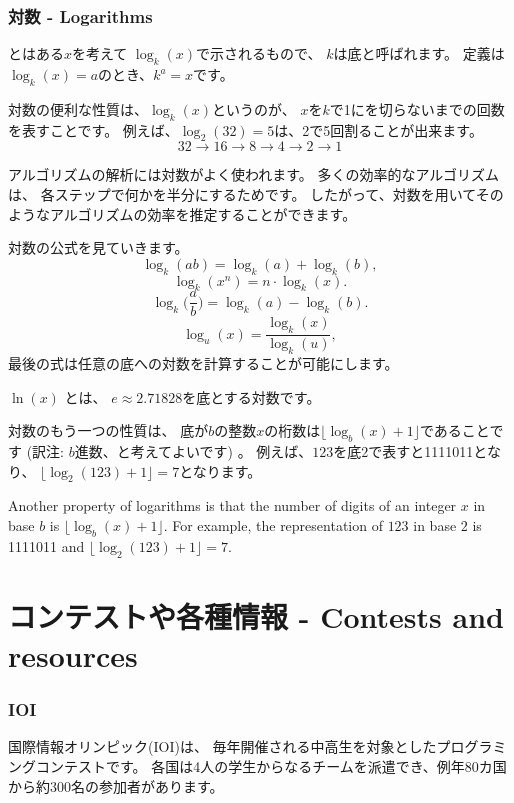 \subsubsection{対数 - Logarithms}


とはある$x$を考えて
$\log_k(x)$で示されるもので、
$k$は底と呼ばれます。
定義は$\log_k(x)=a$のとき、$k^a=x$です。

対数の便利な性質は、$\log_k(x)$というのが、
$x$を$k$で1にを切らないまでの回数を表すことです。
例えば、$\log_2(32)=5$は、2で5回割ることが出来ます。
\[32 \rightarrow 16 \rightarrow 8 \rightarrow 4 \rightarrow 2 \rightarrow 1 \]

アルゴリズムの解析には対数がよく使われます。
多くの効率的なアルゴリズムは、
各ステップで何かを半分にするためです。
したがって、対数を用いてそのようなアルゴリズムの効率を推定することができます。

対数の公式を見ていきます。
\[\log_k(ab) = \log_k(a)+\log_k(b),\]
\[\log_k(x^n) = n \cdot \log_k(x).\]
\[\log_k\Big(\frac{a}{b}\Big) = \log_k(a)-\log_k(b).\]
\[\log_u(x) = \frac{\log_k(x)}{\log_k(u)},\]
最後の式は任意の底への対数を計算することが可能にします。



 $\ln(x)$ とは、
$e \approx 2.71828$を底とする対数です。

対数のもう一つの性質は、
底が$b$の整数$x$の桁数は$\lfloor \log_b(x)+1 \rfloor$であることです
(訳注: $b$進数、と考えてよいです)
。
例えば、$123$を底$2$で表すと1111011となり、
$\lfloor \log_2(123)+1 \rfloor = 7$となります。

Another property of logarithms is that
the number of digits of an integer $x$ in base $b$ is
$\lfloor \log_b(x)+1 \rfloor$.
For example, the representation of
$123$ in base $2$ is 1111011 and
$\lfloor \log_2(123)+1 \rfloor = 7$.

\section{コンテストや各種情報 - Contests and resources}

\subsubsection{IOI}

国際情報オリンピック(IOI)は、
毎年開催される中高生を対象としたプログラミングコンテストです。
各国は4人の学生からなるチームを派遣でき、例年80カ国から約300名の参加者があります。

